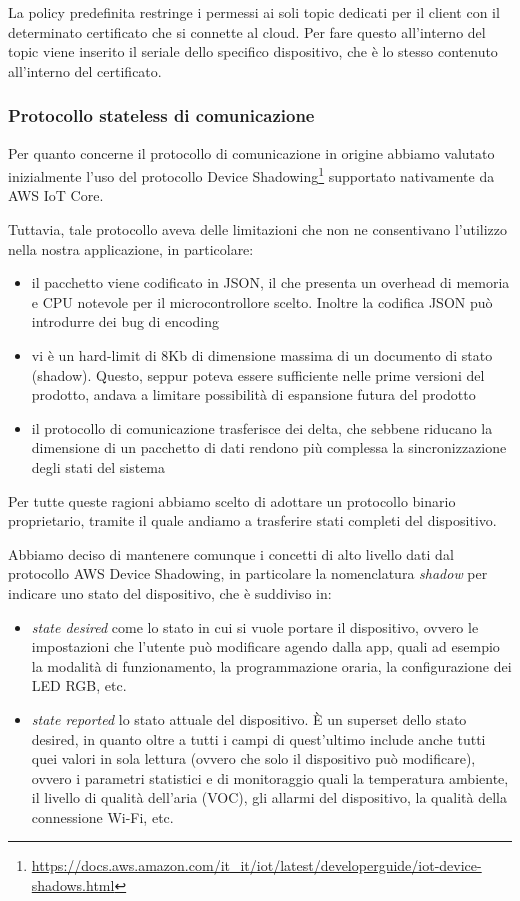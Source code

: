 \documentclass[12pt,a4paper,twoside,titlepage]{book}
\begin{document}
La policy predefinita restringe i permessi ai soli topic dedicati per il client con il determinato certificato
che si connette al cloud. Per fare questo all'interno del topic viene inserito il seriale dello specifico
dispositivo, che è lo stesso contenuto all'interno del certificato.

\subsubsection{Protocollo stateless di comunicazione}

Per quanto concerne il protocollo di comunicazione in origine abbiamo valutato inizialmente
l'uso del protocollo Device Shadowing\footnote{\url{https://docs.aws.amazon.com/it\_it/iot/latest/developerguide/iot-device-shadows.html}}
supportato nativamente da AWS IoT Core.

Tuttavia, tale protocollo aveva delle limitazioni che non ne consentivano l'utilizzo nella nostra
applicazione, in particolare:

\begin{itemize}
    \item il pacchetto viene codificato in JSON, il che presenta un overhead di memoria
        e CPU notevole per il microcontrollore scelto. Inoltre la codifica JSON può
        introdurre dei bug di encoding
    \item vi è un hard-limit di 8Kb di dimensione massima di un documento di stato (shadow).
        Questo, seppur poteva essere sufficiente nelle prime versioni del prodotto, andava
        a limitare possibilità di espansione futura del prodotto
    \item il protocollo di comunicazione trasferisce dei delta, che sebbene riducano la
        dimensione di un pacchetto di dati rendono più complessa la sincronizzazione degli
        stati del sistema
\end{itemize}

Per tutte queste ragioni abbiamo scelto di adottare un protocollo binario proprietario,
tramite il quale andiamo a trasferire stati completi del dispositivo.

Abbiamo deciso di mantenere comunque i concetti di alto livello dati dal protocollo AWS
Device Shadowing, in particolare la nomenclatura \textit{shadow} per indicare uno stato del
dispositivo, che è suddiviso in:
\begin{itemize}
    \item \textit{state desired} come lo stato in cui si vuole portare il dispositivo, ovvero le
        impostazioni che l'utente può modificare agendo dalla app, quali ad esempio la modalità di funzionamento,
        la programmazione oraria, la configurazione dei LED RGB, etc.
    \item \textit{state reported} lo stato attuale del dispositivo. È un superset dello stato
        desired, in quanto oltre a tutti i campi di quest'ultimo include anche tutti quei valori
        in sola lettura (ovvero che solo il dispositivo può modificare), ovvero i parametri
        statistici e di monitoraggio quali la temperatura ambiente, il livello di qualità dell'aria (VOC),
        gli allarmi del dispositivo, la qualità della connessione Wi-Fi, etc.
\end{itemize}
\end{document}
